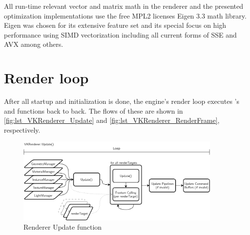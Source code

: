 All run-time relevant vector and matrix math in the renderer and the presented optimization implementations use the free MPL2 licenses Eigen 3.3 math library. Eigen was chosen for its extensive feature set and its special focus on high performance using SIMD vectorization including all current forms of SSE and AVX among others\cite{Guennebaud.2010}.

\section{Render loop} 
After all startup and initialization is done, the engine's render loop executes 's  and  functions back to back. The flows of these are shown in \autoref{fig:lst_VKRenderer_Update} and \autoref{fig:lst_VKRenderer_RenderFrame}, respectively. 

\begin{figure}[htb]
  \centering
  \includegraphics[width=0.9\textwidth]{pictures/Tachyon_VKRenderer_Update}
  \caption[VKRenderer's Update]{Renderer Update function}\label{fig:lst_VKRenderer_Update}
\end{figure} 

